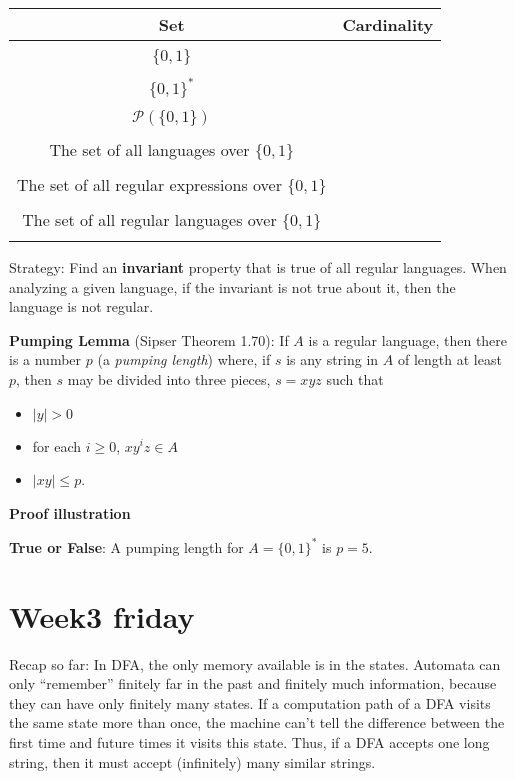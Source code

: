 \documentclass[12pt, oneside]{article}
\begin{document}
\begin{center}
\begin{tabular}{c|c}
Set & Cardinality \\
\hline
& \\
$\{0,1\}$ & \\
& \\
$\{0,1\}^*$ & \\
& \\
$\mathcal{P}( \{0,1\})$ & \\
& \\
The set of all languages over $\{0,1\}$ & \\
& \\
The set of all regular expressions over $\{0,1\}$ & \\
& \\
The set of all regular languages over $\{0,1\}$ & \\
& \\
\end{tabular}
\end{center}



\vfill
Strategy: Find an {\bf invariant} property that is true of all regular languages. When analyzing 
a given language, if the invariant is not true about it, then the language is not regular.
\newpage

{\bf Pumping Lemma} (Sipser Theorem 1.70): If $A$ is a regular language, then there
is a number $p$ (a {\it pumping length}) where, if $s$ is any string in $A$ of length at least $p$, 
then $s$ may be divided into three pieces, $s = xyz$ such that
\vspace{-10pt}
\begin{itemize}
\item $|y| > 0$
\item for each $i \geq 0$, $xy^i z \in A$
\item $|xy| \leq p$.
\end{itemize}


{\bf Proof illustration}


\vfill




{\bf True or False}: A pumping length for $A = \{ 0,1 \}^*$ is $p = 5$.

\vfill \vfill
\section*{Week3 friday}


Recap so far: In DFA, the only memory available is in the states. Automata can only
``remember'' finitely far in the past and finitely much information, because
they can have only finitely many states. If a computation path of a DFA visits 
the same state more than once, the machine can't tell the difference between 
the first time and future times it visits this state. Thus, if 
a DFA accepts one long string, then it must accept (infinitely) many 
similar strings.
\end{document}
